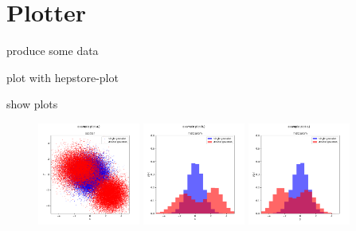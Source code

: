 
\section{Plotter}


produce some data
%
\begin{changemargin}{1.5cm}{1.5cm} 
  
\end{changemargin}
%
plot with hepstore-plot
%
\begin{changemargin}{1.5cm}{1.5cm} 
  
\end{changemargin}
%
%
show plots
%
\begin{figure}
  \centering
  \includegraphics[width=0.3\textwidth]{../examples/hepstore_plot/example_a.pdf}
  \includegraphics[width=0.3\textwidth]{../examples/hepstore_plot/example_b.pdf}
  \includegraphics[width=0.3\textwidth]{../examples/hepstore_plot/example_c.pdf}
  \caption{}
  \label{fig:example_plotting}
\end{figure}
%

